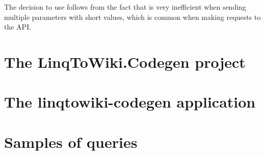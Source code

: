 The decision to use  follows from the fact that
 is very inefficient when sending multiple parameters with short values,
which is common when making requests to the API.


\section{The LinqToWiki.Codegen project}

\section{The linqtowiki-codegen application}

\section{Samples of queries}